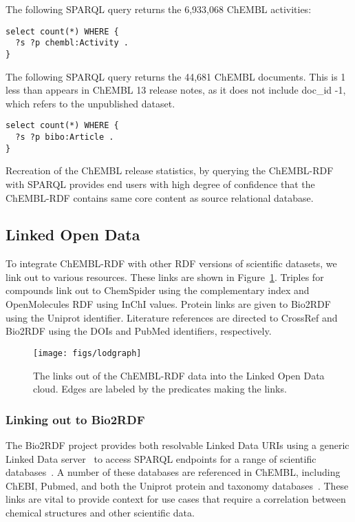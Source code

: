 \documentclass[sw]{iosart2c}
\begin{document}
The following SPARQL query returns the 6,933,068 ChEMBL activities:

\begin{tiny}
\begin{verbatim}
select count(*) WHERE {
  ?s ?p chembl:Activity .
}
\end{verbatim}
\end{tiny}

The following SPARQL query returns the 44,681 ChEMBL documents. This is 1 less than appears 
in ChEMBL 13 release notes, as it does not include doc\_id -1, which refers to the 
unpublished dataset.

\begin{tiny}
\begin{verbatim}
select count(*) WHERE {
  ?s ?p bibo:Article .
}
\end{verbatim}
\end{tiny}

Recreation of the ChEMBL release statistics, by querying the ChEMBL-RDF with SPARQL 
provides end users with high degree of confidence that the ChEMBL-RDF contains same 
core content as source relational database. 


\subsection{Linked Open Data}

To integrate ChEMBL-RDF with other RDF versions of scientific datasets, we link out to various resources.
These links are shown in Figure~\ref{2}. Triples for compounds link out to ChemSpider 
using the complementary index and OpenMolecules RDF using InChI values. Protein links are given to Bio2RDF
using the Uniprot identifier. Literature references are directed to CrossRef and Bio2RDF 
using the DOIs and PubMed identifiers, respectively.

\begin{figure}[t]
\texttt{[image: figs/lodgraph]}
\caption{The links out of the ChEMBL-RDF data into the Linked Open Data cloud.
Edges are labeled by the predicates making the links.}\label{2}
\end{figure}

\subsubsection{Linking out to Bio2RDF}

The Bio2RDF project provides both resolvable Linked Data URIs using a generic Linked Data
server~\cite{Ansell2011} to access SPARQL endpoints for a range of scientific databases~\cite{Belleau2008}.
A number of these databases are referenced in ChEMBL, including ChEBI, Pubmed, and both the
Uniprot protein and taxonomy databases~\cite{TheUniProtConsortium2010}. These links are
vital to provide context for use cases that require a correlation between chemical
structures and other scientific data. 
\end{document}
